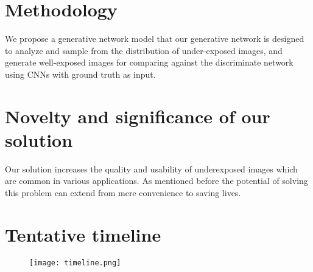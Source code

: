 \documentclass{article}
\begin{document}
\section{Methodology}
We propose a generative network model that our generative network is designed to analyze and sample from the distribution of under-exposed images, and generate well-exposed images for comparing against the discriminate network using CNNs with ground truth as input. 
\section{Novelty and significance of our solution}
Our solution increases the quality and usability of underexposed images which are common in various applications. As mentioned before the potential of solving this problem can extend from mere convenience to saving lives.
\section{Tentative timeline}
\begin{figure}[h]
  \centering
  \texttt{[image: timeline.png]}
\end{figure}

\medskip
\printbibliography %
\end{document}
